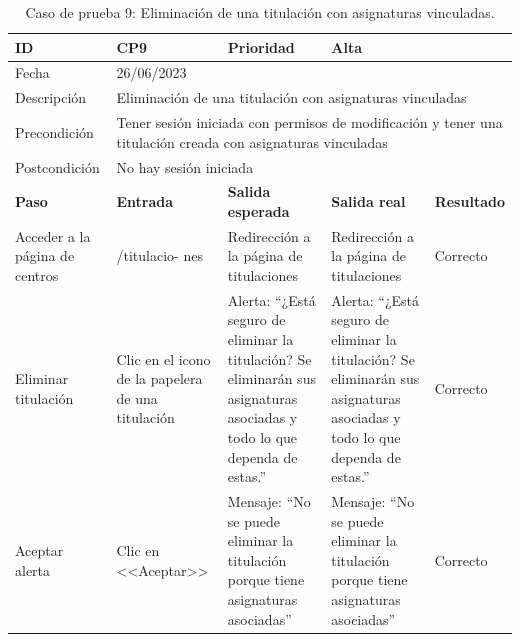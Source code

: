 \begin{table}[H]
\small
\begin{tabular}{p{} p{} p{} p{} p{}}
\cellcolor{gray!25}
ID   & CP9 & \cellcolor{gray!25} Prioridad   & Alta \\ \hline
\cellcolor{gray!25} Fecha	&	\multicolumn{4}{l}{26/06/2023} \\ \hline
\cellcolor{gray!25} Descripción		&	\multicolumn{4}{p{.66\textwidth}}{Eliminación de una titulación con asignaturas vinculadas} \\ \hline                                            
\cellcolor{gray!25}
Precondición  & \multicolumn{4}{p{.66\textwidth}}{Tener sesión iniciada con permisos de modificación y tener una titulación creada con asignaturas vinculadas} \\ \hline
\cellcolor{gray!25} Postcondición & \multicolumn{4}{l}{No hay sesión iniciada}                                                    \\ \hline
\rowcolor{gray!25}
\textbf{Paso}   & \textbf{Entrada} & \textbf{Salida esperada} & \textbf{Salida real} & \textbf{Resultado} \\ \hline
Acceder a la página de centros 
& /titulacio-
nes                                                                           
& Redirección a la página de titulaciones                                   
& Redirección a la página de titulaciones                                   
& Correcto                            
\\ \hline
Eliminar titulación
& Clic en el icono de la papelera de una titulación
& Alerta: ``¿Está seguro de eliminar la titulación? Se eliminarán sus asignaturas asociadas y todo lo que dependa de estas.''
& Alerta: ``¿Está seguro de eliminar la titulación? Se eliminarán sus asignaturas asociadas y todo lo que dependa de estas.''
& Correcto
\\ \hline
Aceptar alerta
& Clic en <<Aceptar>>
& Mensaje: ``No se puede eliminar la titulación porque tiene asignaturas asociadas''                            
& Mensaje: ``No se puede eliminar la titulación porque tiene asignaturas asociadas''
& Correcto                            
\\ \hline                
\end{tabular}
\caption{Caso de prueba 9: Eliminación de una titulación con asignaturas vinculadas.}\label{table:CP9}
\end{table}

